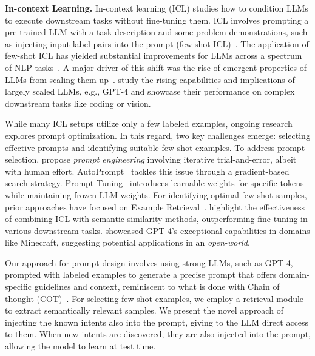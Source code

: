 \documentclass[11pt]{article}
\begin{document}
\vspace{3px}
\textbf{In-context Learning.} In-context learning (ICL) studies how to condition LLMs to execute downstream tasks without fine-tuning them. ICL involves prompting a pre-trained LLM with a task description and some problem demonstrations, such as injecting input-label pairs into the prompt (few-shot ICL)~\citep{brown2020language,xie2021explanation}. The application of few-shot ICL has yielded substantial improvements for LLMs across a spectrum of NLP tasks~\citep{liang2022holistic}. A major driver of this shift was the rise of emergent properties of LLMs from scaling them up~\citep{wei2022emergent}. \citet{bubeck2023sparks} study the rising capabilities and implications of largely scaled LLMs, e.g., GPT-4 and showcase their performance on complex downstream tasks like coding or vision.

While many ICL setups utilize only a few labeled examples, ongoing research explores prompt optimization. In this regard, two key challenges emerge: selecting effective prompts and identifying suitable few-shot examples. To address prompt selection, \citet{brown2020language} propose \textit{prompt engineering} involving iterative trial-and-error, albeit with human effort. AutoPrompt~\citep{shin2020autoprompt} tackles this issue through a gradient-based search strategy. Prompt Tuning~\citep{lester2021power} introduces learnable weights for specific tokens while maintaining frozen LLM weights. For identifying optimal few-shot samples, prior approaches have focused on Example Retrieval~\citep{rubin2022learning}. \citet{gao2023ambiguityaware} highlight the effectiveness of combining ICL with semantic similarity methods, outperforming fine-tuning in various downstream tasks. \citet{wang2023voyager} showcased GPT-4's exceptional capabilities in domains like Minecraft, suggesting potential applications in an \textit{open-world}.

Our approach for prompt design involves using strong LLMs, such as GPT-4, prompted with labeled examples to generate a precise prompt that offers domain-specific guidelines and context, reminiscent to what is done with Chain of thought (COT)~\cite{chu2023survey}. For selecting few-shot examples, we employ a retrieval module to extract semantically relevant samples. We present the novel approach of injecting the known intents also into the prompt, giving to the LLM direct access to them. When new intents are discovered, they are also injected into the prompt, allowing the model to learn at test time.
\end{document}
